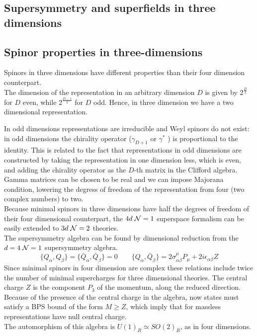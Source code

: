 \begin{appendices}
\section{Supersymmetry and superfields in three dimensions}
\subsection{Spinor properties in three-dimensions}
Spinors in three dimensions have different properties than their four dimension counterpart.\\
The dimension of the representation in an arbitrary dimension $D$  is given by $2^{\frac{D}{2}} $
for $D$ even, while $2^{\frac{D-1}{2}} $ for $D$ odd.
Hence, in three dimension we have a two dimensional representation.

In odd dimensions representations are irreducible and Weyl spinors do not exist: in odd dimensions the chirality operator ($\gamma_{D+1}$ or $\gamma^*$ ) is proportional to the identity.
This is related to the fact that representations in odd dimensions are constructed by taking the representation in one dimension less, which is even, and adding the chirality operator as the $D$-th matrix in the Clifford algebra.\\
Gamma matrices can be chosen to be real and we can impose Majorana condition, lowering the degress of freedom of the representation from four (two complex numbers) to two.\\
Because minimal spinors in three dimensions have half the degrees of freedom of their four dimensional counterpart, the $4d \; \mathcal{N}=1$ superspace formalism can be easily extended to $3d \; \mathcal{N}=2$ theories.
\\
The supersymmetry algebra can be found by dimensional reduction from  the $d=4 \; \mathcal{N}=1$ supersymmetry algebra. 
\begin{equation}
 \{ Q_{\alpha},Q_{\beta} \} =  \{ \bar{Q}_{\alpha},\bar{Q}_{\beta} \}= 0 \qquad \{ Q_{\alpha} , \bar{Q}_{\beta}   \} = 2 \sigma^{\mu}_{\alpha \beta} P_{\mu} + 2 i \epsilon_{\alpha \beta} Z
 \end{equation} 
Since minimal spinors in four dimension are complex these relations include twice the number of minimal supercharges for three dimensional theories.
The central charge $Z$ is the component $P_3$ of the momentum, along the reduced direction.
Because of the presence of the central charge in the algebra, now states must satisfy a BPS bound of the form $M \geq Z $, which imply that for massless representations have null central charge.
\\
The automorphism of this algebra is $U(1)_R \simeq SO(2)_R$, as in four dimensions.


\end{appendices}

